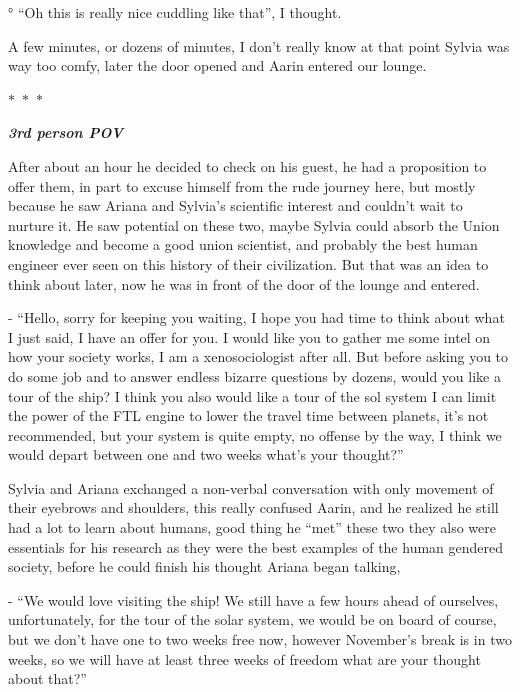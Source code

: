\documentclass[colorlinks,12pt,a4paper]{book}
\newcommand\sep{\begin{center}
  \boldmath $\ast$~$\ast$~$\ast$
\end{center}}
\begin{document}
° “Oh this is really nice cuddling like that”, I thought.\par
\bigskip

A few minutes, or dozens of minutes, I don't really know at that point Sylvia was way too comfy, later the door opened 
and Aarin entered our lounge.

\sep

\textit{\textbf{3rd person POV}}\par
\bigskip

After about an hour he decided to check on his guest, he had a proposition to offer them, 
in part to excuse himself from the rude journey here, but mostly because he saw Ariana and Sylvia's 
scientific interest and couldn't wait to nurture it. He saw potential on these two, maybe Sylvia could absorb the 
Union knowledge and become a good union scientist, and probably the best human engineer ever seen on this history 
of their civilization. But that was an idea to think about later, now he was in front of the door of the lounge and entered.\par
\bigskip

- “Hello, sorry for keeping you waiting, I hope you had time to think about what I just said,
 I have an offer for you. I would like you to gather me some intel on how your society works, I am a xenosociologist
  after all. But before asking you to do some job and to answer endless bizarre questions by dozens, would you like 
  a tour of the ship? I think you also would like a tour of the sol system I can limit the power of the FTL engine 
  to lower the travel time between planets, it's not recommended, but your system is quite empty, no offense by the way, 
  I think we would depart between one and two weeks what's your thought?”\par
  \bigskip

Sylvia and Ariana exchanged a non-verbal conversation with only movement of their eyebrows and shoulders, this really 
confused Aarin, and he realized he still had a lot to learn about humans, good thing he “met” these two they also 
were essentials for his research as they were the best examples of the human gendered society, before he could 
finish his thought Ariana began talking,\par
\bigskip

- “We would love visiting the ship! We still have a few hours ahead of ourselves, unfortunately, for the tour of
 the solar system, we would be on board of course, but we don't have one to two weeks free now, however November's break
 is in two weeks, so we will have at least three weeks of freedom what are your thought about that?”\par
 \bigskip
\end{document}
